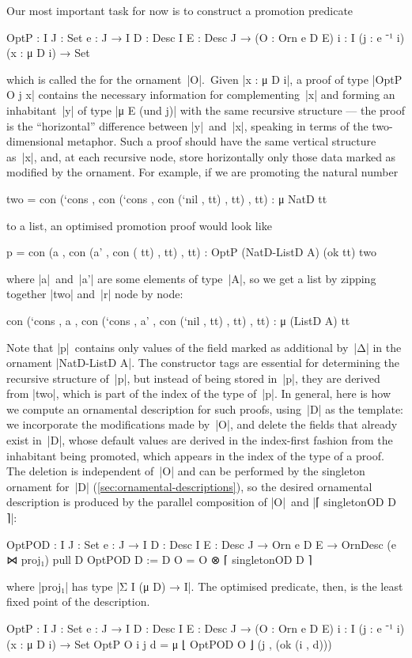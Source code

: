 Our most important task for now is to construct a promotion predicate
\begin{spec}
OptP :  {I J : Set} {e : J → I} {D : Desc I} {E : Desc J} →
        (O : Orn e D E) {i : I} (j : e ⁻¹ i) (x : μ D i) → Set
\end{spec}
which is called the  for the ornament~|O|.\
Given |x : μ D i|, a proof of type |OptP O j x| contains the necessary information for complementing~|x| and forming an inhabitant~|y| of type |μ E (und j)| with the same recursive structure --- the proof is the ``horizontal'' difference between |y|~and~|x|, speaking in terms of the two-dimensional metaphor.
Such a proof should have the same vertical structure as~|x|, and, at each recursive node, store horizontally only those data marked as modified by the ornament.
For example, if we are promoting the natural number
\begin{code}
two =  con (`cons  ,
       con (`cons  ,
       con (`nil   ,
         tt) , tt) , tt) : μ NatD tt
\end{code}
to a list, an optimised promotion proof would look like
\begin{code}
p =  con (a   ,
     con (a'  ,
     con (
       tt) , tt) , tt) : OptP (NatD-ListD A) (ok tt) two
\end{code}
where |a|~and~|a'| are some elements of type~|A|, so we get a list by zipping together |two| and~|r| node by node:
\begin{code}
con (`cons  , a   ,
con (`cons  , a'  ,
con (`nil   ,
  tt) , tt) , tt) : μ (ListD A) tt
\end{code}
Note that |p|~contains only values of the field marked as additional by~|Δ| in the ornament |NatD-ListD A|.
The constructor tags are essential for determining the recursive structure of~|p|, but instead of being stored in~|p|, they are derived from |two|, which is part of the index of the type of~|p|.
In general, here is how we compute an ornamental description for such proofs, using~|D| as the template:
we incorporate the modifications made by~|O|, and delete the fields that already exist in~|D|, whose default values are derived in the index-first fashion from the inhabitant being promoted, which appears in the index of the type of a proof.
The deletion is independent of~|O| and can be performed by the singleton ornament for~|D| (\autoref{sec:ornamental-descriptions}), so the desired ornamental description is produced by the parallel composition of |O|~and |⌈ singletonOD D ⌉|:
\begin{code}
OptPOD :  {I J : Set} {e : J → I} {D : Desc I} {E : Desc J} →
          Orn e D E → OrnDesc (e ⋈ proj₁) pull D
OptPOD {D := D} O = O ⊗ ⌈ singletonOD D ⌉
\end{code}
where |proj₁| has type |Σ I (μ D) → I|.
The optimised predicate, then, is the least fixed point of the description.
\begin{code}
OptP :  {I J : Set} {e : J → I} {D : Desc I} {E : Desc J} →
        (O : Orn e D E) {i : I} (j : e ⁻¹ i) (x : μ D i) → Set
OptP O {i} j d = μ ⌊ OptPOD O ⌋ (j , (ok (i , d)))
\end{code}


